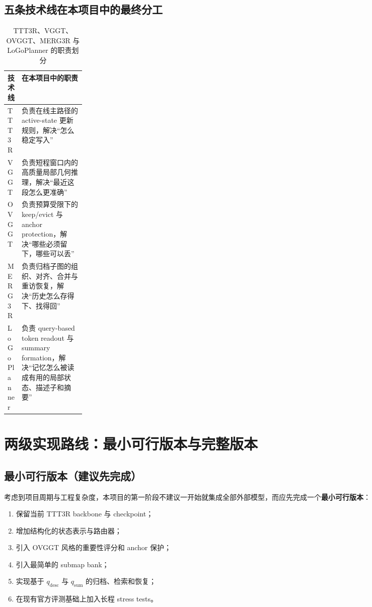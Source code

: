 \documentclass[12pt]{article}
\begin{document}
\subsection{五条技术线在本项目中的最终分工}

\begin{table}[H]
\centering
\caption{TTT3R、VGGT、OVGGT、MERG3R 与 LoGoPlanner 的职责划分}
\label{tab:role-split}
\begin{tabularx}{\linewidth}{>{\raggedright\arraybackslash}p{0.18\linewidth}X}
\toprule
技术线 & 在本项目中的职责 \\
\midrule
TTT3R & 负责在线主路径的 active-state 更新规则，解决“怎么稳定写入” \\
VGGT & 负责短程窗口内的高质量局部几何推理，解决“最近这段怎么更准确” \\
OVGGT & 负责预算受限下的 keep/evict 与 anchor protection，解决“哪些必须留下，哪些可以丢” \\
MERG3R & 负责归档子图的组织、对齐、合并与重访恢复，解决“历史怎么存得下、找得回” \\
LoGoPlanner & 负责 query-based token readout 与 summary formation，解决“记忆怎么被读成有用的局部状态、描述子和摘要” \\
\bottomrule
\end{tabularx}
\end{table}

\section{两级实现路线：最小可行版本与完整版本}

\subsection{最小可行版本（建议先完成）}

考虑到项目周期与工程复杂度，本项目的第一阶段不建议一开始就集成全部外部模型，而应先完成一个\textbf{最小可行版本}：
\begin{enumerate}
  \item 保留当前 TTT3R backbone 与 checkpoint；
  \item 增加结构化的状态表示与路由器；
  \item 引入 OVGGT 风格的重要性评分和 anchor 保护；
  \item 引入最简单的 submap bank；
  \item 实现基于 $q_{\text{desc}}$ 与 $q_{\text{sum}}$ 的归档、检索和恢复；
  \item 在现有官方评测基础上加入长程 stress tests。
\end{enumerate}
\end{document}
